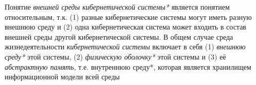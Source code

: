 Понятие \textit{внешней среды кибернетической системы*} является понятием относительным, т.к. (1) разные кибернетические системы могут иметь разную внешнюю среду и (2) одна кибернетическая система может входить в состав внешней среды другой кибернетической системы. 
В общем случае среда жизнедеятельности \textit{кибернетической системы} включает в себя (1) \textit{внешнюю среду*} этой системы, (2) \textit{физическую оболочку*} этой системы и (3) её \textit{абстрактную память}, т.е. внутреннюю среду*, которая является хранилищем информационной модели всей среды
